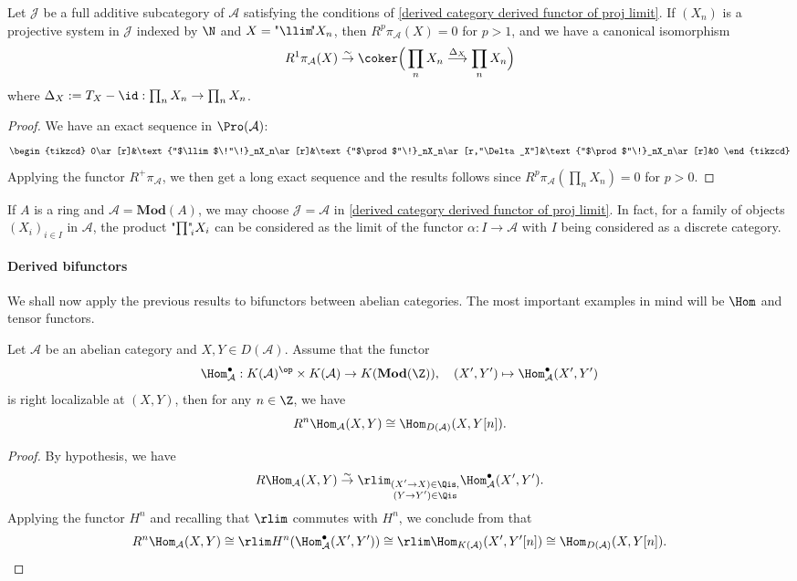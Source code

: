 \begin{corollary}
Let $\mathcal{J}$ be a full additive subcategory of $\mathcal{A}$ satisfying the conditions of \cref{derived category derived functor of proj limit}. If $(X_n)$ is a projective system in $\mathcal{J}$ indexed by $\N$ and $X=\text{"$\llim$\!"}X_n$, then $R^p\pi_\mathcal{A}(X)=0$ for $p>1$, and we have a canonical isomorphism
\[R^1\pi_\mathcal{A}(X)\stackrel{\sim}{\to} \coker\Big(\prod_nX_n\stackrel{\Delta_X}{\longrightarrow}\prod_nX_n\Big)\]
where $\Delta_X:=T_X-\id:\prod_nX_n\to\prod_nX_n$.
\end{corollary}
\begin{proof}
We have an exact sequence in $\Pro(\mathcal{A})$:
\[\begin{tikzcd}
0\ar[r]&\text{"$\llim$\!"\!}_nX_n\ar[r]&\text{"$\prod$"\!}_nX_n\ar[r,"\Delta_X"]&\text{"$\prod$"\!}_nX_n\ar[r]&0
\end{tikzcd}\]
Applying the functor $R^+\pi_\mathcal{A}$, we then get a long exact sequence and the results follows since $R^p\pi_\mathcal{A}(\prod_nX_n)=0$ for $p>0$.
\end{proof}

\begin{example}
If $A$ is a ring and $\mathcal{A}=\mathbf{Mod}(A)$, we may choose $\mathcal{J}=\mathcal{A}$ in \cref{derived category derived functor of proj limit}. In fact, for a family of objects $(X_i)_{i\in I}$ in $\mathcal{A}$, the product $\text{"$\prod$"\!}_iX_i$ can be considered as the limit of the functor $\alpha:I\to\mathcal{A}$ with $I$ being considered as a discrete category.
\end{example}

\paragraph{Derived bifunctors}
We shall now apply the previous results to bifunctors between abelian categories. The most important examples in mind will be $\Hom$ and tensor functors.
\begin{theorem}\label{derived category R^0Hom is Hom in D(A)}
Let $\mathcal{A}$ be an abelian category and $X,Y\in D(\mathcal{A})$. Assume that the functor
\[\Hom_\mathcal{A}^\bullet:K(\mathcal{A})^{\op}\times K(\mathcal{A})\to K(\mathbf{Mod}(\Z)),\quad (X',Y')\mapsto \Hom_\mathcal{A}^{\bullet}(X',Y')\]
is right localizable at $(X,Y)$, then for any $n\in\Z$, we have
\[R^n\Hom_\mathcal{A}(X,Y)\cong\Hom_{D(\mathcal{A})}(X,Y[n]).\]
\end{theorem}
\begin{proof}
By hypothesis, we have
\[R\Hom_\mathcal{A}(X,Y)\stackrel{\sim}{\to} \rlim_{\substack{(X'\to X)\in\Qis,\\(Y\to Y')\in\Qis}}\Hom_\mathcal{A}^\bullet(X',Y').\]
Applying the functor $H^n$ and recalling that $\rlim$ commutes with $H^n$, we conclude from \cite[Proposition 11.7.3]{kashiwara_SAC} that
\begin{equation*}
R^n\Hom_\mathcal{A}(X,Y)\cong \rlim H^n(\Hom_\mathcal{A}^\bullet(X',Y'))\cong \rlim \Hom_{K(\mathcal{A})}(X',Y'[n])\cong\Hom_{D(\mathcal{A})}(X,Y[n]).\qedhere
\end{equation*}
\end{proof}

